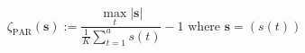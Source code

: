 \begin{equation}
	\zeta_\text{PAR}(\textbf{s}) := \frac{\max_t \left| \textbf{s} \right|}{\frac{1}{K}\sum_{t=1}^{a}{s}(t)} - 1
	\text{ where } \textbf{s} = ({s}(t))
\label{ch1:equ:peak-to-average-definition}
\end{equation}